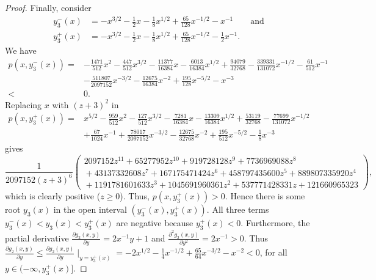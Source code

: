 \documentclass[11pt]{article}
\begin{document}
\begin{proof}
 Finally, consider
 \begin{align*}
  y_3^-(x) &= -x^{3/2} - \frac{1}{2} x - \frac{1}{8} x^{1/2} + \frac{65}{128} x^{-1/2} - x^{-1}
  \qquad \text{and}\\
  y_3^+(x) &= -x^{3/2} - \frac{1}{2} x - \frac{1}{8} x^{1/2} + \frac{65}{128} x^{-1/2} - \frac{1}{2} x^{-1}.
 \end{align*}
 We have
 \begin{align*}
  p(x, y_3^-(x)) = {}
  &-\frac{1471}{512} x^2
   - \frac{447}{512} x^{3/2}
   - \frac{11377}{16384} x
   - \frac{6013}{16384} x^{1/2}
   + \frac{94079}{32768}
   - \frac{339331}{131072} x^{-1/2}
   - \frac{61}{512} x^{-1}\\
   &- \frac{511807}{2097152} x^{-3/2}
   - \frac{12675}{16384} x^{-2}
   + \frac{195}{128} x^{-5/2}
   - x^{-3}\\
   < {}&0.
 \end{align*}
 Replacing $x$ with $(z + 3)^2$ in
 \begin{align*}
  p(x, y_3^+(x)) = {}
  &x^{5/2}
  - \frac{959}{512} x^2
  - \frac{127}{512} x^{3/2}
  - \frac{7281}{16384} x
  - \frac{13309}{16384} x^{1/2}
  + \frac{53119}{32768}
  - \frac{77699}{131072} x^{-1/2}\\
  &+ \frac{67}{1024} x^{-1}
  + \frac{78017}{2097152} x^{-3/2}
  - \frac{12675}{32768} x^{-2}
  + \frac{195}{512} x^{-5/2}
  - \frac{1}{8} x^{-3}
 \end{align*}
 gives
 \[
  \frac{1}{2097152 (z+3)^6}
  \left(
   \begin{array}{lll}
    2097152 z^{11}
    + 65277952 z^{10}
    + 919728128 z^9
    + 7736969088 z^8\\
    {}+ 43137332608 z^7
    + 167175471424 z^6
    + 458797435600 z^5
    + 889807335920 z^4\\
    {}+ 1191781601633 z^3
    + 1045691960361 z^2
    + 537771428331 z
    + 121660965323
   \end{array}
  \right),
 \]
 which is clearly positive  ($z \ge 0$).
 Thus, $p(x, y_3^+(x)) > 0$.
 Hence there is some root $y_3(x)$ in the open interval $(y_3^-(x), y_3^+(x))$.
 All three terms $y_3^-(x) < y_3(x) < y_3^+(x)$ are negative because $y_3^+(x) < 0$.
 Furthermore, the partial derivative $\frac{\partial g_2(x,y)}{\partial y} = 2 x^{-1} y + 1$
 and $\frac{\partial^2 g_2(x,y)}{\partial y^2} = 2 x^{-1} > 0$.
 Thus $\frac{\partial g_2(x,y)}{\partial y} \le \frac{\partial g_2(x,y)}{\partial y} \mid_{y=y_3^+(x)} = -2 x^{1/2} - \frac{1}{4} x^{-1/2} + \frac{65}{64} x^{-3/2} - x^{-2} < 0$, 
 for all $y \in (-\infty, y_3^+(x)]$.

\end{proof}
\end{document}
